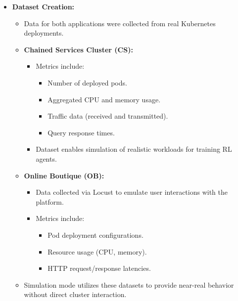 \documentclass[conference]{IEEEtran}
\begin{document}
\begin{itemize}
    \item \textbf{Dataset Creation:}
    \begin{itemize}
        \item Data for both applications were collected from real Kubernetes deployments.
        \item \textbf{Chained Services Cluster (CS):}
        \begin{itemize}
            \item Metrics include:
            \begin{itemize}
                \item Number of deployed pods.
                \item Aggregated CPU and memory usage.
                \item Traffic data (received and transmitted).
                \item Query response times.
            \end{itemize}
            \item Dataset enables simulation of realistic workloads for training RL agents.
        \end{itemize}
        \item \textbf{Online Boutique (OB):}
        \begin{itemize}
            \item Data collected via Locust to emulate user interactions with the platform.
            \item Metrics include:
            \begin{itemize}
                \item Pod deployment configurations.
                \item Resource usage (CPU, memory).
                \item HTTP request/response latencies.
            \end{itemize}
        \end{itemize}
        \item Simulation mode utilizes these datasets to provide near-real behavior without direct cluster interaction.
    \end{itemize}


\end{itemize}
\end{document}
